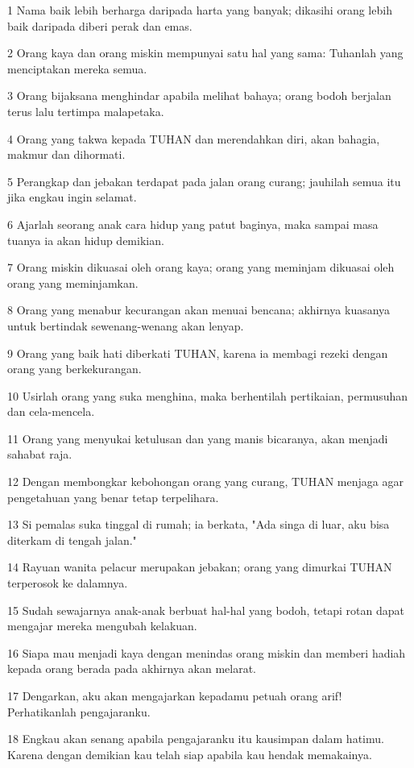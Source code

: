 \par 1 Nama baik lebih berharga daripada harta yang banyak; dikasihi orang lebih baik daripada diberi perak dan emas.
\par 2 Orang kaya dan orang miskin mempunyai satu hal yang sama: Tuhanlah yang menciptakan mereka semua.
\par 3 Orang bijaksana menghindar apabila melihat bahaya; orang bodoh berjalan terus lalu tertimpa malapetaka.
\par 4 Orang yang takwa kepada TUHAN dan merendahkan diri, akan bahagia, makmur dan dihormati.
\par 5 Perangkap dan jebakan terdapat pada jalan orang curang; jauhilah semua itu jika engkau ingin selamat.
\par 6 Ajarlah seorang anak cara hidup yang patut baginya, maka sampai masa tuanya ia akan hidup demikian.
\par 7 Orang miskin dikuasai oleh orang kaya; orang yang meminjam dikuasai oleh orang yang meminjamkan.
\par 8 Orang yang menabur kecurangan akan menuai bencana; akhirnya kuasanya untuk bertindak sewenang-wenang akan lenyap.
\par 9 Orang yang baik hati diberkati TUHAN, karena ia membagi rezeki dengan orang yang berkekurangan.
\par 10 Usirlah orang yang suka menghina, maka berhentilah pertikaian, permusuhan dan cela-mencela.
\par 11 Orang yang menyukai ketulusan dan yang manis bicaranya, akan menjadi sahabat raja.
\par 12 Dengan membongkar kebohongan orang yang curang, TUHAN menjaga agar pengetahuan yang benar tetap terpelihara.
\par 13 Si pemalas suka tinggal di rumah; ia berkata, "Ada singa di luar, aku bisa diterkam di tengah jalan."
\par 14 Rayuan wanita pelacur merupakan jebakan; orang yang dimurkai TUHAN terperosok ke dalamnya.
\par 15 Sudah sewajarnya anak-anak berbuat hal-hal yang bodoh, tetapi rotan dapat mengajar mereka mengubah kelakuan.
\par 16 Siapa mau menjadi kaya dengan menindas orang miskin dan memberi hadiah kepada orang berada pada akhirnya akan melarat.
\par 17 Dengarkan, aku akan mengajarkan kepadamu petuah orang arif! Perhatikanlah pengajaranku.
\par 18 Engkau akan senang apabila pengajaranku itu kausimpan dalam hatimu. Karena dengan demikian kau telah siap apabila kau hendak memakainya.
